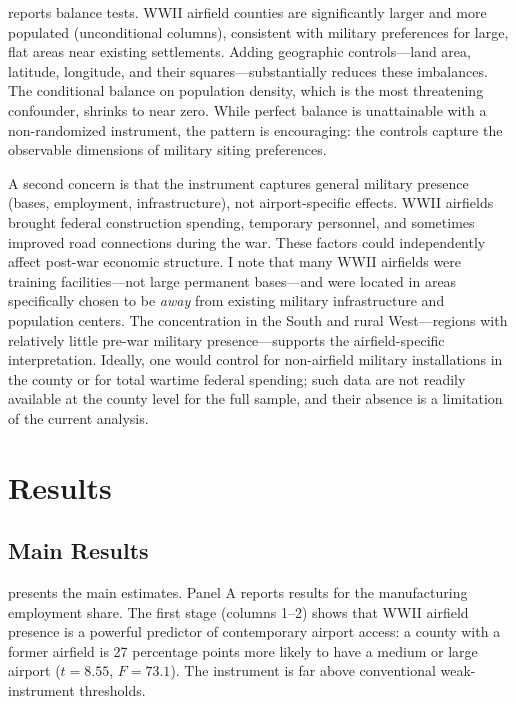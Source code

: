 \documentclass[12pt]{article}
\begin{document}


 reports balance tests. WWII airfield counties are significantly larger and more populated (unconditional columns), consistent with military preferences for large, flat areas near existing settlements. Adding geographic controls---land area, latitude, longitude, and their squares---substantially reduces these imbalances. The conditional balance on population density, which is the most threatening confounder, shrinks to near zero. While perfect balance is unattainable with a non-randomized instrument, the pattern is encouraging: the controls capture the observable dimensions of military siting preferences.

A second concern is that the instrument captures general military presence (bases, employment, infrastructure), not airport-specific effects. WWII airfields brought federal construction spending, temporary personnel, and sometimes improved road connections during the war. These factors could independently affect post-war economic structure. I note that many WWII airfields were training facilities---not large permanent bases---and were located in areas specifically chosen to be \emph{away} from existing military infrastructure and population centers. The concentration in the South and rural West---regions with relatively little pre-war military presence---supports the airfield-specific interpretation. Ideally, one would control for non-airfield military installations in the county or for total wartime federal spending; such data are not readily available at the county level for the full sample, and their absence is a limitation of the current analysis.

\section{Results}

\subsection{Main Results}



 presents the main estimates. Panel A reports results for the manufacturing employment share. The first stage (columns 1--2) shows that WWII airfield presence is a powerful predictor of contemporary airport access: a county with a former airfield is 27 percentage points more likely to have a medium or large airport ($t = 8.55$, $F = 73.1$). The instrument is far above conventional weak-instrument thresholds.
\end{document}
